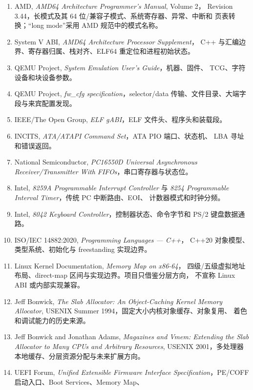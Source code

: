 \begin{enumerate}
  1264 个球位坐标、信号名和接口分类据此重绘；生成时使用的 Ballout 文件
  SHA-256 为
  。
  \item AMD, \emph{AMD64 Architecture Programmer's Manual}, Volume 2，
  Revision 3.44，长模式及其 64 位/兼容子模式、系统寄存器、异常、中断和
  页表转换；“long mode”采用 AMD 规范中的模式名称。
  \item System V ABI, \emph{AMD64 Architecture Processor Supplement}，
  C++ 与汇编边界、寄存器归属、栈对齐、ELF64 重定位和进程初始状态。
  \item QEMU Project, \emph{System Emulation User's Guide}，机器、固件、
  TCG、字符设备和块设备参数。
  \item QEMU Project, \emph{fw\_cfg specification}，selector/data
  传输、文件目录、大端字段与来宾配置发现。
  \item IEEE/The Open Group, \emph{ELF gABI}，ELF 文件头、程序头和装载段。
  \item INCITS, \emph{ATA/ATAPI Command Set}，ATA PIO 端口、状态机、
  LBA 寻址和错误返回。
  \item National Semiconductor, \emph{PC16550D Universal
  Asynchronous Receiver/Transmitter With FIFOs}，串口寄存器与状态位。
  \item Intel, \emph{8259A Programmable Interrupt Controller} 与
  \emph{8254 Programmable Interval Timer}，传统 PC 中断路由、EOI、
  计数器模式和时钟分频。
  \item Intel, \emph{8042 Keyboard Controller}，控制器状态、命令字节和
  PS/2 键盘数据通路。
  \item ISO/IEC 14882:2020, \emph{Programming Languages --- C++}，
  C++20 对象模型、类型系统、初始化与 freestanding 实现边界。
  \item Linux Kernel Documentation, \emph{Memory Map on x86-64}，
  四级/五级虚拟地址布局、direct-map 区间与实现边界。项目只借鉴分层方向，
  不宣称 Linux ABI 或内部实现兼容。
  \item Jeff Bonwick, \emph{The Slab Allocator: An Object-Caching Kernel
  Memory Allocator}, USENIX Summer 1994，固定大小内核对象缓存、对象复用、
  着色和调试能力的历史来源。
  \item Jeff Bonwick and Jonathan Adams, \emph{Magazines and Vmem:
  Extending the Slab Allocator to Many CPUs and Arbitrary Resources},
  USENIX 2001，多处理器本地缓存、分层资源分配与未来扩展方向。
  \item UEFI Forum, \emph{Unified Extensible Firmware Interface
  Specification}，PE/COFF 启动入口、Boot Services、Memory Map、

\end{enumerate}
